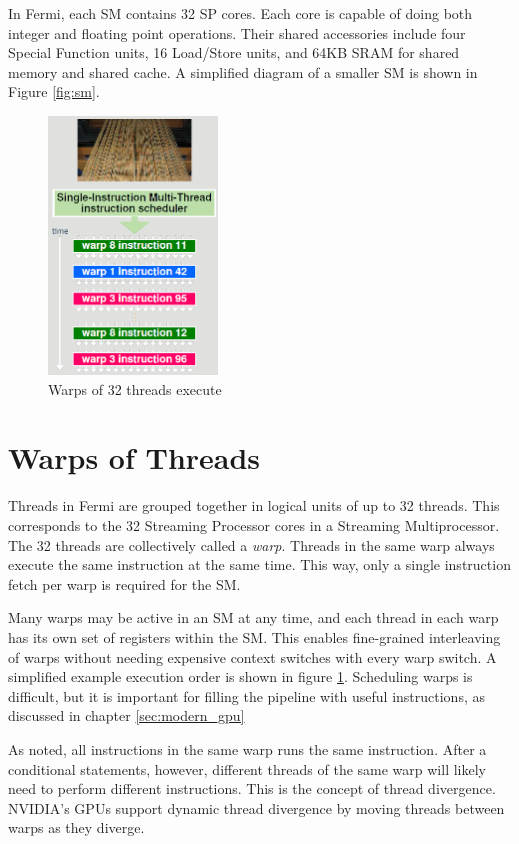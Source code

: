 \documentclass[../main/report.tex]{subfiles}
\begin{document}
In Fermi, each SM contains 32 SP cores. 
Each core is capable of doing both integer and floating point operations.
Their shared accessories include four Special Function units, 16 Load/Store units, and 64KB SRAM for shared memory and shared cache.
A simplified diagram of a smaller SM is shown in Figure \ref{fig:sm}.

\begin{figure}[H]
\centering
\includegraphics[width=0.4\textwidth]{../introduction/assets/warp.png}
\caption{Warps of 32 threads execute }
\label{fig:simple-nvidia-warps}
\end{figure}

\section{Warps of Threads}

Threads in Fermi are grouped together in logical units of up to 32 threads.
This corresponds to the 32 Streaming Processor cores in a Streaming Multiprocessor.
The 32 threads are collectively called a \emph{warp}. 
Threads in the same warp always execute the same instruction at the same time.
This way, only a single instruction fetch per warp is required for the SM.

Many warps may be active in an SM at any time, and each thread in each warp has its own set of registers within the SM.
This enables fine-grained interleaving of warps without needing expensive context switches with every warp switch. 
A simplified example execution order is shown in figure \ref{fig:simple-nvidia-warps}.
Scheduling warps is difficult, but it is important for filling the pipeline with useful instructions, as discussed in chapter \ref{sec:modern_gpu}

As noted, all instructions in the same warp runs the same instruction.
After a conditional statements, however, different threads of the same warp will likely need to perform different instructions.
This is the concept of thread divergence.
NVIDIA's GPUs support dynamic thread divergence by moving threads between warps as they diverge.
\end{document}

